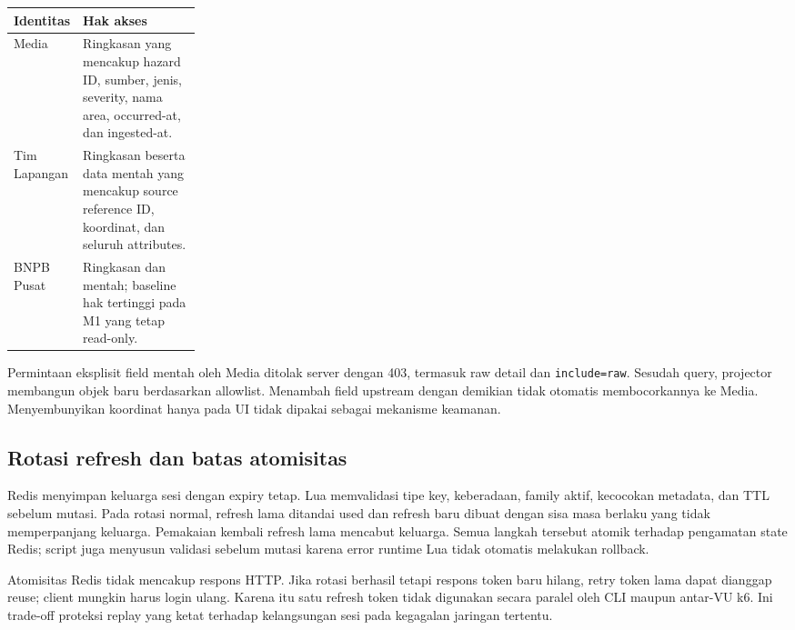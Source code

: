 \begin{tabularx}{\linewidth}{P{0.24\linewidth}Y}
\toprule Identitas & Hak akses\\\midrule
Media & Ringkasan yang mencakup hazard ID, sumber, jenis, severity, nama area, occurred-at, dan ingested-at.\\
Tim Lapangan & Ringkasan beserta data mentah yang mencakup source reference ID, koordinat, dan seluruh attributes.\\
BNPB Pusat & Ringkasan dan mentah; baseline hak tertinggi pada M1 yang tetap read-only.\\
\bottomrule
\end{tabularx}

Permintaan eksplisit field mentah oleh Media ditolak server dengan 403, termasuk raw detail dan \texttt{include=raw}. Sesudah query, projector membangun objek baru berdasarkan allowlist. Menambah field upstream dengan demikian tidak otomatis membocorkannya ke Media. Menyembunyikan koordinat hanya pada UI tidak dipakai sebagai mekanisme keamanan.


\subsection{Rotasi refresh dan batas atomisitas}

Redis menyimpan keluarga sesi dengan expiry tetap. Lua memvalidasi tipe key, keberadaan, family aktif, kecocokan metadata, dan TTL sebelum mutasi. Pada rotasi normal, refresh lama ditandai used dan refresh baru dibuat dengan sisa masa berlaku yang tidak memperpanjang keluarga. Pemakaian kembali refresh lama mencabut keluarga. Semua langkah tersebut atomik terhadap pengamatan state Redis; script juga menyusun validasi sebelum mutasi karena error runtime Lua tidak otomatis melakukan rollback.

Atomisitas Redis tidak mencakup respons HTTP. Jika rotasi berhasil tetapi respons token baru hilang, retry token lama dapat dianggap reuse; client mungkin harus login ulang. Karena itu satu refresh token tidak digunakan secara paralel oleh CLI maupun antar-VU k6. Ini trade-off proteksi replay yang ketat terhadap kelangsungan sesi pada kegagalan jaringan tertentu.

